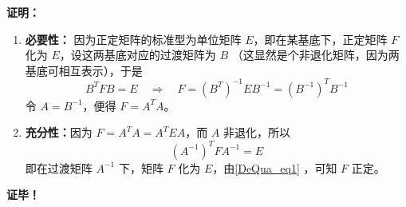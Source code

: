 \textbf{证明：}
\begin{enumerate}
\item \textbf{必要性：}
因为正定矩阵的标准型为单位矩阵 $E$，即在某基底下，正定矩阵 $F$ 化为 $E$，设这两基底对应的过渡矩阵为 $B$ （这显然是个非退化矩阵，因为两基底可相互表示），于是
\begin{equation}
B^TFB=E\quad\Rightarrow\quad F={(B^T)}^{-1}EB^{-1}={(B^{-1})}^TB^{-1}
\end{equation}
令 $A=B^{-1}$，便得 $F=A^TA$。
\item \textbf{充分性：}因为 $F=A^TA=A^TEA$，而 $A$ 非退化，所以
\begin{equation}
{(A^{-1})}^TFA^{-1}=E
\end{equation}
即在过渡矩阵 $A^{-1}$ 下，矩阵 $F$ 化为 $E$，由\autoref{DeQua_eq1} ，可知 $F$ 正定。
\end{enumerate}
\textbf{证毕！}
